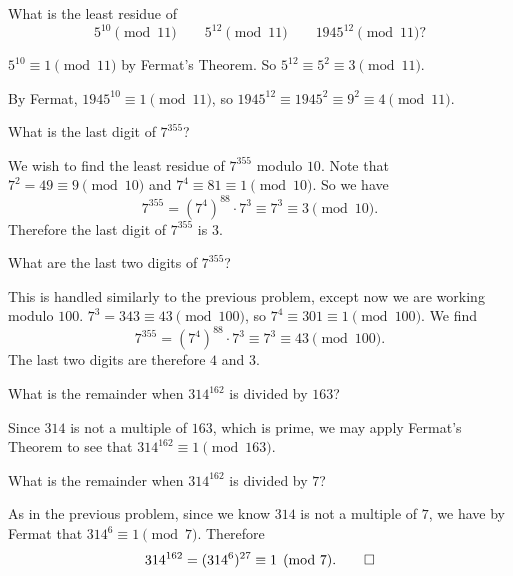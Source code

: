  What is the least residue of
\begin{equation*}
  5^{10}\pmod{11} \qquad 5^{12}\pmod{11} \qquad 1945^{12}\pmod{11}?
\end{equation*}
\begin{solution}
  $5^{10}\equiv1\pmod{11}$ by Fermat's Theorem. So
  $5^{12} \equiv 5^2 \equiv 3\pmod{11}$.

  By Fermat, $1945^{10}\equiv1\pmod{11}$, so
  $1945^{12}\equiv1945^2\equiv9^2\equiv4\pmod{11}$.
\end{solution}

 What is the last digit of $7^{355}$?
\begin{solution}
  We wish to find the least residue of $7^{355}$ modulo $10$. Note
  that $7^2 = 49 \equiv 9\pmod{10}$ and
  $7^4\equiv81\equiv1\pmod{10}$. So we have
  \begin{equation*}
    7^{355} = (7^4)^{88}\cdot7^3 \equiv 7^3 \equiv 3 \pmod {10}.
  \end{equation*}
  Therefore the last digit of $7^{355}$ is $3$.
\end{solution}

 What are the last two digits of $7^{355}$?
\begin{solution}
  This is handled similarly to the previous problem, except now we are
  working modulo $100$. $7^3 = 343 \equiv 43\pmod{100}$, so
  $7^4\equiv301\equiv1\pmod{100}$. We find
  \begin{equation*}
    7^{355} = (7^4)^{88}\cdot7^3 \equiv 7^3 \equiv 43\pmod{100}.
  \end{equation*}
  The last two digits are therefore $4$ and $3$.
\end{solution}

 What is the remainder when $314^{162}$ is divided by $163$?
\begin{solution}
  Since $314$ is not a multiple of $163$, which is prime, we may apply
  Fermat's Theorem to see that $314^{162}\equiv1\pmod{163}$.
\end{solution}

 What is the remainder when $314^{162}$ is divided by $7$?
\begin{solution}
  As in the previous problem, since we know $314$ is not a multiple of
  $7$, we have by Fermat that $314^6\equiv1\pmod7$. Therefore
  \begin{equation*}
    314^{162} = (314^6)^{27} \equiv 1\pmod7. \qedhere
  \end{equation*}
\end{solution}

